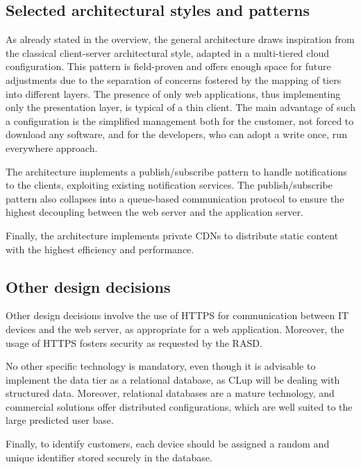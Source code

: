 \documentclass[../../main.tex]{subfiles}
\begin{document}
\subsection{Selected architectural styles and patterns}


    As already stated in the overview, the general architecture draws inspiration from the classical client-server architectural style, adapted in a multi-tiered cloud configuration.  
    This pattern is field-proven and offers enough space for future adjustments due to the separation of concerns fostered by the mapping of tiers into different layers.
    The presence of only web applications, thus implementing only the presentation layer, is typical of a thin client. The main advantage of such a configuration is the simplified management both for the customer, not forced to download any software, and for the developers, who can adopt a write once, run everywhere approach.

    The architecture implements a publish/subscribe pattern to handle notifications to the clients, exploiting existing notification services. 
    The publish/subscribe pattern also collapses into a queue-based communication protocol to ensure the highest decoupling between the web server and the application server.

    Finally, the architecture implements private CDNs to distribute static content with the highest efficiency and performance.

\subsection{Other design decisions}


    Other design decisions involve the use of HTTPS for communication between IT devices and the web server, as appropriate for a web application. 
    Moreover, the usage of HTTPS fosters security as requested by the RASD.

    No other specific technology is mandatory, even though it is advisable to implement the data tier as a relational database, 
    as CLup will be dealing with structured data. Moreover, relational databases are a mature technology, and commercial solutions offer distributed configurations, 
    which are well suited to the large predicted user base.

    Finally, to identify customers, each device should be assigned a random and unique identifier stored securely in the database. 
\end{document}
